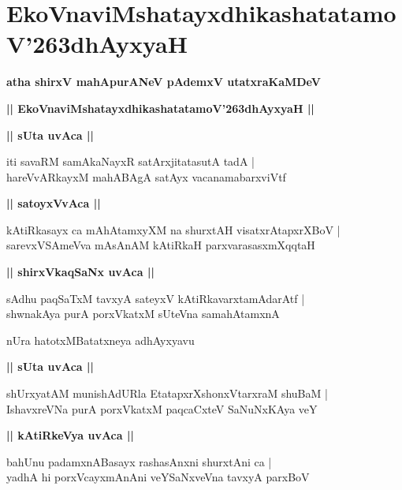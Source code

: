 \documentclass[twoside,12pt,openright]{book}
\def\S{\char'263}
\newcounter{shloka}[chapter]
\def\uvaca#1{\centerline{{\large\textbf{#1}}}}
\begin{document}
\chapter{EkoVnaviMshatayxdhikashatatamoV\S dhAyxyaH}

\begin{center}
{\LARGE\bfseries atha shirxV mahApurANeV pAdemxV utatxraKaMDeV}
\end{center}

\begin{center}
{\LARGE\bfseries || EkoVnaviMshatayxdhikashatatamoV\S dhAyxyaH || }
\end{center}

\uvaca{|| sUta uvAca ||}

\begin{shloka}%
iti savaRM samAkaNayxR satArxjitatasutA tadA |\\
hareVvARkayxM mahABAgA satAyx vacanamabarxviVtf 
\end{shloka}

\uvaca{|| satoyxVvAca ||}

\begin{shloka}%
kAtiRkasayx ca mAhAtamxyXM na shurxtAH visatxrAtapxrXBoV |\\
sarevxVSAmeVva mAsAnAM kAtiRkaH parxvarasasxmXqqtaH 
\end{shloka}

\uvaca{|| shirxVkaqSaNx uvAca ||}

\begin{shloka}%
sAdhu paqSaTxM tavxyA sateyxV kAtiRkavarxtamAdarAtf |\\
shwnakAya purA porxVkatxM sUteVna samahAtamxnA 
\end{shloka}

\begin{center}
nUra hatotxMBatatxneya adhAyxyavu
\end{center}

\uvaca{|| sUta uvAca ||}

\begin{shloka}%
shUrxyatAM munishAdURla EtatapxrXshonxVtarxraM shuBaM |\\
IshavxreVNa purA porxVkatxM paqcaCxteV SaNuNxKAya veY
\end{shloka}

\uvaca{|| kAtiRkeVya uvAca ||}

\begin{shloka}%
bahUnu padamxnABasayx rashasAnxni shurxtAni ca |\\
yadhA hi porxVcayxmAnAni veYSaNxveVna tavxyA parxBoV
\end{shloka}
\end{document}
